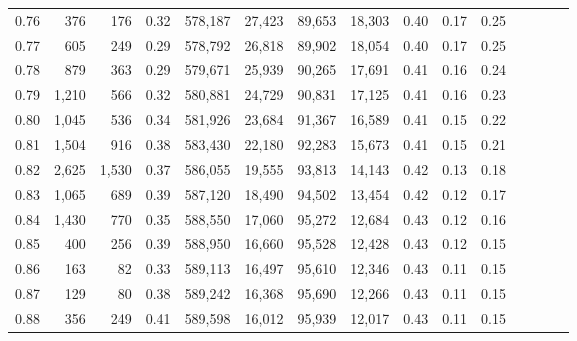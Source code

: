 \begin{tabular}{rrrcrrrrrrrrrrr}
0.76 &     376 &    176 &                                       0.32 &  578,187 &   27,423 &   89,653 &   18,303 &  0.40 &  0.17 &                         0.25 \\
0.77 &     605 &    249 &                                       0.29 &  578,792 &   26,818 &   89,902 &   18,054 &  0.40 &  0.17 &                         0.25 \\
0.78 &     879 &    363 &                                       0.29 &  579,671 &   25,939 &   90,265 &   17,691 &  0.41 &  0.16 &                         0.24 \\
0.79 &   1,210 &    566 &                                       0.32 &  580,881 &   24,729 &   90,831 &   17,125 &  0.41 &  0.16 &                         0.23 \\
0.80 &   1,045 &    536 &                                       0.34 &  581,926 &   23,684 &   91,367 &   16,589 &  0.41 &  0.15 &                         0.22 \\
0.81 &   1,504 &    916 &                                       0.38 &  583,430 &   22,180 &   92,283 &   15,673 &  0.41 &  0.15 &                         0.21 \\
0.82 &   2,625 &  1,530 &                                       0.37 &  586,055 &   19,555 &   93,813 &   14,143 &  0.42 &  0.13 &                         0.18 \\
0.83 &   1,065 &    689 &                                       0.39 &  587,120 &   18,490 &   94,502 &   13,454 &  0.42 &  0.12 &                         0.17 \\
0.84 &   1,430 &    770 &                                       0.35 &  588,550 &   17,060 &   95,272 &   12,684 &  0.43 &  0.12 &                         0.16 \\
0.85 &     400 &    256 &                                       0.39 &  588,950 &   16,660 &   95,528 &   12,428 &  0.43 &  0.12 &                         0.15 \\
0.86 &     163 &     82 &                                       0.33 &  589,113 &   16,497 &   95,610 &   12,346 &  0.43 &  0.11 &                         0.15 \\
0.87 &     129 &     80 &                                       0.38 &  589,242 &   16,368 &   95,690 &   12,266 &  0.43 &  0.11 &                         0.15 \\
0.88 &     356 &    249 &                                       0.41 &  589,598 &   16,012 &   95,939 &   12,017 &  0.43 &  0.11 &                         0.15 \\

\end{tabular}

